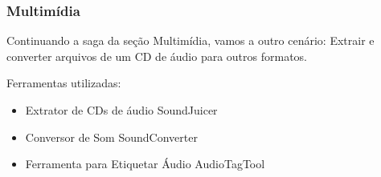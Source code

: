 \begin{frame}\frametitle{Multimídia}
Continuando a saga da seção Multimídia, vamos a outro cenário: Extrair e converter
arquivos de um CD de áudio para outros formatos.

Ferramentas utilizadas:
\begin{itemize}
	\item Extrator de CDs de áudio SoundJuicer
	\item Conversor de Som SoundConverter
	\item Ferramenta para Etiquetar Áudio AudioTagTool
\end{itemize}

\end{frame}





